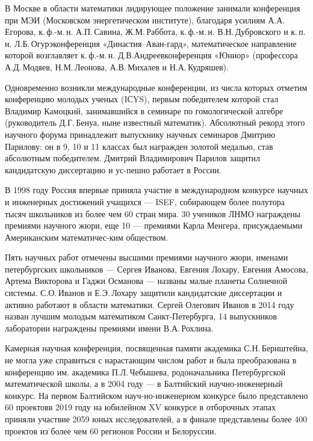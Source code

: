 \ms\abz В Москве в области математики лидирующее положение занимали конференция при МЭИ (Московском энергетическом институте), благодаря усилиям А.А.\,Егорова, к.\,ф.-м.\,н. А.П.\,Савина, Ж.М.\,Раббота, к.\,ф.-м.\,н. В.Н.\,Дубровского и к.\,п.\,н. Л.Б.\,Огурэ\scolon конференция «Династия–Аван-\linebreak гард», математическое направление которой возглавляет к.\,ф.-м.\,н. Д.В.\linebreak Андреев\scolon конференция «Юниор» (профессора А.Д.\,Модяев, Н.М.\,Леонова, А.В.\,Михалев и Н.А.\,Кудряшев).

\ms\abz Одновременно возникли международные конференции, из числа которых отметим конференцию молодых ученых (IСYS),  первым победителем которой стал Владимир Камоцкий, занимавшийся в семинаре по гомологической алгебре (руководитель Д.Г.\,Бенуа, ныне известный математик). Абсолютный рекорд этого научного форума принадлежит выпускнику научных семинаров Дмитрию Парилову: он в 9, 10 и 11 классах был награжден золотой медалью, став абсолютным победителем. Дмитрий Владимирович Парилов защитил кандидатскую диссертацию и ус-\linebreak пешно работает в России. 

\ms\abz В 1998 году Россия впервые приняла участие в международном конкурсе научных и инженерных достижений учащихся — ISEF, собирающем более полутора тысяч школьников из более чем 60 стран мира. 30 учеников ЛНМО награждены премиями научного жюри, еще 10 — премиями Карла Менгера, присуждаемыми Американским математичес-\linebreak ким обществом.

\ms\abz Пять научных работ отмечены высшими премиями научного жюри, именами петербургских школьников — Сергея Иванова, Евгения Лохару, Евгения Амосова, Артема Викторова и Гаджи Османова — названы малые планеты Солнечной системы. С.О.\,Иванов и Е.Э.\,Лохару защитили кандидатские диссертации и активно работают в области математики. Сергей Олегович Иванов в 2014 году назван лучшим молодым математиком Санкт-Петербурга, 14 выпускников лаборатории награждены премиями имени В.А.\,Рохлина.

\ms\abz Камерная научная конференция, посвященная памяти академика С.Н.\,Бернштейна, не могла уже справиться с нарастающим числом работ и была преобразована в конференцию им. академика П.Л.\,Чебышева, родоначальника Петербургской математической школы, а в 2004 году — в Балтийский научно-инженерный конкурс. На первом Балтийском науч-\linebreak но-инженерном конкурсе было представлено 60 проектов\scolon в 2019 году на юбилейном XV конкурсе в отборочных этапах приняли участвие 2059 юных исследователей, а в финале представлены более 400 проектов из более чем 60 регионов России и Белоруссии.

